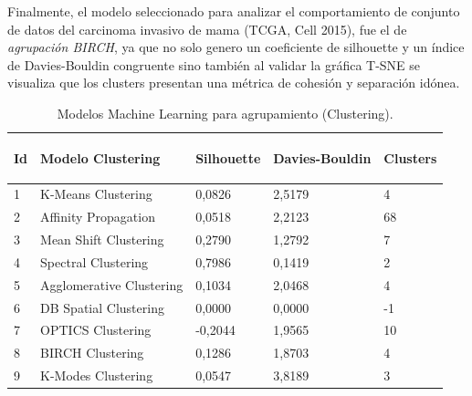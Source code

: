 Finalmente, el modelo seleccionado para analizar el comportamiento de conjunto de datos del carcinoma invasivo de mama (TCGA, Cell 2015), fue el de \textit{agrupación BIRCH}, ya que no solo genero un coeficiente de silhouette y un índice de Davies-Bouldin congruente sino también al validar la gráfica T-SNE se visualiza que los clusters presentan una métrica de cohesión y separación idónea.

\begin{table} [!htb]
	\footnotesize
	\begin{threeparttable}
		\caption{Modelos Machine Learning para agrupamiento (Clustering).}
		\label{Clustering_Models}
		\begin{tabular}{p{1cm} p{6cm} p{2.5cm} p{2.5cm} p{1.5cm}} \toprule	
			\begin{center}Id\end{center}
			&\begin{center}Modelo Clustering\end{center}
			&\begin{center}Silhouette\end{center}
			&\begin{center}Davies-Bouldin\end{center}
			&\begin{center}Clusters\end{center}
			\\ \hline 1 & K-Means Clustering 	&	0,0826	&	2,5179	&	4
			\\ \hline 2 & Affinity Propagation	&	0,0518	&	2,2123	&	68
			\\ \hline 3 & Mean Shift Clustering 	&	0,2790	&	1,2792	&	7
			\\ \hline 4 & Spectral Clustering	&	0,7986	&	0,1419	&	2
			\\ \hline 5 & Agglomerative Clustering	&	0,1034	&	2,0468	&	4
			\\ \hline 6 & DB Spatial Clustering 	&	0,0000	&	0,0000	&	-1
			\\ \hline 7 & OPTICS Clustering	&	-0,2044	&	1,9565	&	10
			\\ \hline 8 & BIRCH Clustering	&	0,1286	&	1,8703	&	4
			\\ \hline 9 & K-Modes Clustering	&	0,0547	&	3,8189	&	3
			\\ \hline
		\end{tabular}
	\end{threeparttable}
\end{table}

